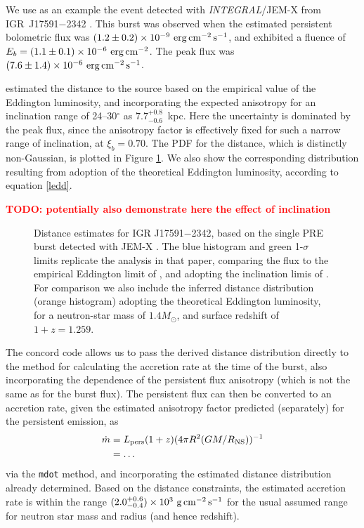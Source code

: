 \documentclass{aastex63}
\newcommand{\epcs}{{\rm erg\,cm^{-2}\,s^{-1}}}
\newcommand{\igr}{{\it INTEGRAL}}
\newcommand{\todo}[1]{\textbf{\textcolor{red}{TODO: #1}}} %
\begin{document}
We use as an example 
the event detected with \igr/JEM-X from IGR~J17591$-$2342 \cite[]{kuiper20}. This burst was observed  when the estimated persistent bolometric flux was $(1.2\pm0.2)\times10^{-9}\ \epcs$, and exhibited a fluence of $E_b =(1.1\pm0.1)\times10^{-6}\ {\rm erg\,cm^{-2}}$. The peak flux was $(7.6\pm1.4)\times10^{-6}\ \epcs$.

\cite{kuiper20} estimated the distance to the source based on the empirical value of the Eddington luminosity, and incorporating the expected anisotropy for an inclination range of 
24--30$^\circ$ \cite[]{sanna18} as $7.7_{-0.6}^{+0.8}$~kpc. Here the uncertainty is dominated by the peak flux, since the anisotropy factor is effectively fixed for such a narrow range of inclination, at $\xi_b=0.70$.
%
The PDF for the distance, which is distinctly non-Gaussian, is plotted in Figure \ref{fig:dist_igr17591}. We also show the corresponding distribution resulting from adoption of the theoretical Eddington luminosity, according to equation \ref{ledd}.

\todo{potentially also demonstrate here the effect of inclination}

\begin{figure}[ht!]
\caption{Distance estimates for IGR J17591$-$2342, based on the single PRE burst detected with JEM-X \cite[]{kuiper20}. The blue histogram and green 1-$\sigma$ limits replicate the analysis in that paper, comparing the flux to the empirical Eddington limit of \cite[]{kuul03a}, and adopting the inclination limis of \cite[]{sanna18}.  For comparison we also include the inferred distance distribution (orange histogram) adopting the theoretical Eddington luminosity, for a neutron-star mass of $1.4M_\odot$, and surface redshift of $1+z=1.259$.
\label{fig:dist_igr17591}}
\end{figure}

The {\sc concord} code allows us to pass the derived distance distribution directly to the method for calculating the accretion rate at the time of the burst, also incorporating the dependence of the persistent flux anisotropy (which is not the same as for the burst flux).
%
The persistent flux can then be converted to an accretion rate, given the estimated anisotropy factor predicted (separately) for the persistent emission, as
\begin{eqnarray}
\dot{m} & = L_{\rm pers} (1+z) (4\pi R^2(GM/R_{\rm NS}))^{-1}\\
& = \ldots
\end{eqnarray}
via the {\tt mdot} method, and incorporating the estimated distance distribution already determined. 
%
Based on the distance constraints, the estimated accretion rate  is within the range $(2.0_{-0.4}^{+0.6})\times10^3\ \rm{g\,cm^{-2}\,s^{-1}}$ for the usual assumed range for neutron star mass and radius (and hence redshift).
\end{document}

